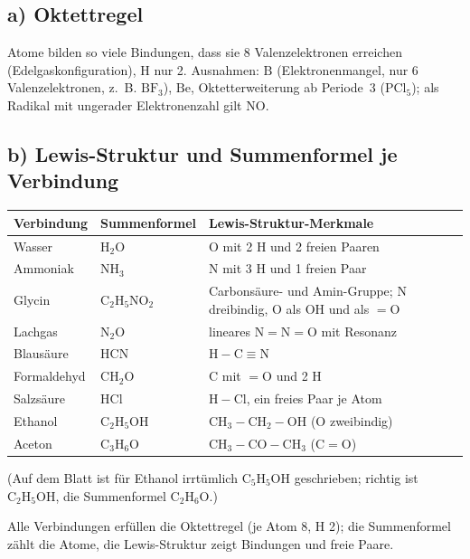 
\subsection*{a) Oktettregel}
Atome bilden so viele Bindungen, dass sie 8 Valenzelektronen erreichen
(Edelgaskonfiguration), H nur 2. Ausnahmen: $\mathrm{B}$ (Elektronenmangel, nur 6 Valenzelektronen, z.\ B.
$\mathrm{BF_3}$), $\mathrm{Be}$, Oktetterweiterung ab
Periode~3 ($\mathrm{PCl_5}$); als Radikal mit ungerader Elektronenzahl gilt
$\mathrm{NO}$.

\subsection*{b) Lewis-Struktur und Summenformel je Verbindung}
\begin{center}
\begin{tabular}{@{}l l l@{}}
  Verbindung & Summenformel & Lewis-Struktur-Merkmale \\
  \hline
  Wasser      & $\mathrm{H_2O}$ & O mit 2 H und 2 freien Paaren \\
  Ammoniak    & $\mathrm{NH_3}$ & N mit 3 H und 1 freien Paar \\
  Glycin      & $\mathrm{C_2H_5NO_2}$ &
     Carbonsäure- und Amin-Gruppe; N dreibindig, O als $\mathrm{OH}$ und als $\mathrm{=O}$ \\
  Lachgas     & $\mathrm{N_2O}$ & lineares $\mathrm{N=N=O}$ mit Resonanz \\
  Blausäure   & $\mathrm{HCN}$ & $\mathrm{H-C\equiv N}$ \\
  Formaldehyd & $\mathrm{CH_2O}$ & C mit $\mathrm{=O}$ und 2 H \\
  Salzsäure   & $\mathrm{HCl}$ & $\mathrm{H-Cl}$, ein freies Paar je Atom \\
  Ethanol     & $\mathrm{C_2H_5OH}$ & $\mathrm{CH_3-CH_2-OH}$ (O zweibindig) \\
  Aceton      & $\mathrm{C_3H_6O}$ & $\mathrm{CH_3-CO-CH_3}$ ($\mathrm{C=O}$) \\
\end{tabular}
\end{center}

(Auf dem Blatt ist für Ethanol irrtümlich $\mathrm{C_5H_5OH}$ geschrieben;
richtig ist $\mathrm{C_2H_5OH}$, die Summenformel $\mathrm{C_2H_6O}$.)

\begin{ergebnis}
Alle Verbindungen erfüllen die Oktettregel (je Atom 8, H 2); die Summenformel
zählt die Atome, die Lewis-Struktur zeigt Bindungen und freie Paare.
\end{ergebnis}

